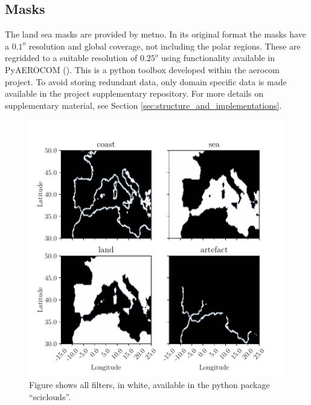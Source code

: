 \subsection{Masks} \label{sec:mask}
The land sea masks are provided by \acrfull{metno}. In its original format the masks have a $0.1^o$ resolution and global coverage, not including the polar regions. These are regridded to a suitable resolution of $0.25^o$ using functionality available in PyAEROCOM (\cite{pyaerocom}). %
This is a python toolbox developed within the \acrfull{aerocom} project. To avoid storing redundant data, only domain specific data is made available in the project supplementary repository. For more details on supplementary material, see Section \ref{sec:structure_and_implementations}.
\begin{figure}
    \centering
    \includegraphics{python_figs/filters.pdf}
    \caption{Figure shows all filters, in white, available in the python package ``sciclouds''.}
    \label{fig:filters_subplot}
\end{figure}

